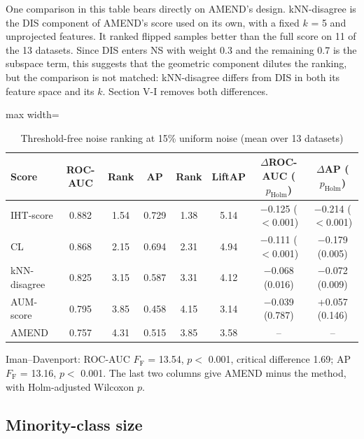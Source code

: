 \documentclass[conference]{IEEEtran}
\begin{document}
One comparison in this table bears directly on AMEND's design. kNN-disagree is the DIS component of AMEND's score used on its own, with a fixed $k$ = 5 and unprojected features. It ranked flipped samples better than the full score on 11 of the 13 datasets. Since DIS enters NS with weight 0.3 and the remaining 0.7 is the subspace term, this suggests that the geometric component dilutes the ranking, but the comparison is not matched: kNN-disagree differs from DIS in both its feature space and its $k$. Section V-I removes both differences.

\begin{table}[!t]
\centering
\footnotesize
\caption{Threshold-free noise ranking at 15\% uniform noise (mean over 13 datasets)}
\label{tab:11}
\setlength{\tabcolsep}{3.5pt}
\begin{adjustbox}{max width=\linewidth}
\begin{tabular}{lccccccc}
\hline
Score & ROC-AUC & Rank & AP & Rank & LiftAP & $\Delta $ROC-AUC ($p_{\mathrm{Holm}}$) & $\Delta $AP ($p_{\mathrm{Holm}}$) \\
\hline
IHT-score & 0.882 & 1.54 & 0.729 & 1.38 & 5.14 & $-$0.125 ($<$0.001) & $-$0.214 ($<$0.001) \\
CL & 0.868 & 2.15 & 0.694 & 2.31 & 4.94 & $-$0.111 ($<$0.001) & $-$0.179 (0.005) \\
kNN-disagree & 0.825 & 3.15 & 0.587 & 3.31 & 4.12 & $-$0.068 (0.016) & $-$0.072 (0.009) \\
AUM-score & 0.795 & 3.85 & 0.458 & 4.15 & 3.14 & $-$0.039 (0.787) & +0.057 (0.146) \\
AMEND & 0.757 & 4.31 & 0.515 & 3.85 & 3.58 & -- & -- \\
\hline
\end{tabular}
\end{adjustbox}
\par\vspace{3pt}
\begin{minipage}{\linewidth}\scriptsize Iman--Davenport: ROC-AUC $F_{\mathrm{F}}$ = 13.54, $p <$ 0.001, critical difference 1.69; AP $F_{\mathrm{F}}$ = 13.16, $p <$ 0.001. The last two columns give AMEND minus the method, with Holm-adjusted Wilcoxon $p$.\end{minipage}
\end{table}

\subsection{Minority-class size}\label{sec:minority-class-size}
\end{document}
